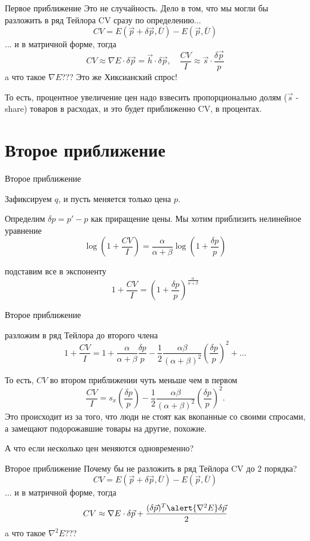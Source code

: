 \documentclass{beamer}
\begin{document}
\begin{frame}{Первое приближение}
Это не случайность. Дело в том, что мы могли бы разложить в ряд Тейлора CV сразу по определению...
$$ CV = E(\vec p +  \delta \vec p, \bar U) - E(\vec p, \bar U)$$ 
... и в матричной форме, тогда
$$ CV \approx \nabla E \cdot  \delta \vec p = \vec h \cdot  \delta \vec p, \quad \frac{CV}{I} \approx \vec s \cdot \frac{\delta \vec p}{p}$$ 
a что такое $\nabla E$??? Это же Хиксианский спрос! 

То есть, процентное увеличение цен надо взвесить пропорционально долям ($\vec s$ - share) товаров в расходах, и это будет приближенно CV, в процентах.
\end{frame}

\section{Второе приближение}

\begin{frame}{Второе приближение}

Зафиксируем $q$, и пусть меняется только цена $p$.

Определим $\delta p = p'-p$ как приращение цены. Мы хотим приблизить нелинейное уравнение
$$\log(1 + \frac{CV}{I}) = \frac{\alpha}{\alpha + \beta} \log (1 + \frac{\delta p}{p})$$

подставим все в экспоненту
$$1 + \frac{CV}{I} = (1 + \frac{\delta p}{p})^{\frac{\alpha}{\alpha + \beta}}$$
\end{frame}

\begin{frame}{Второе приближение}

разложим в ряд Тейлора до второго члена
$$1 + \frac{CV}{I} = 1 + \frac{\alpha}{\alpha + \beta} \frac{\delta p}{p} - \frac{1}{2}\frac{\alpha \beta}{(\alpha + \beta)^2} (\frac{\delta p}{p})^2 + \ldots$$

То есть, $CV$ во втором приближении чуть меньше чем в первом
$$\frac{CV}{I} = s_x (\frac{\delta p}{p}) - \frac{1}{2}\frac{\alpha \beta}{(\alpha + \beta)^2} (\frac{\delta p}{p})^2.$$
Это происходит из за того, что люди не стоят как вкопанные со своими спросами, а замещают подорожавшие товары на другие, похожие.

А что если несколько цен меняются одновременно?
\end{frame}

\begin{frame}{Второе приближение}
Почему бы не разложить в ряд Тейлора CV до 2 порядка?
$$ CV = E(\vec p +  \delta \vec p, \bar U) - E(\vec p, \bar U)$$ 
... и в матричной форме, тогда
$$ CV \approx \nabla E \cdot  \delta \vec p + \frac{( \delta \vec p)^T \alert{\nabla^2 E}  \delta \vec p}{2}$$ 
a что такое $\nabla^2 E$???
\end{frame}
\end{document}
